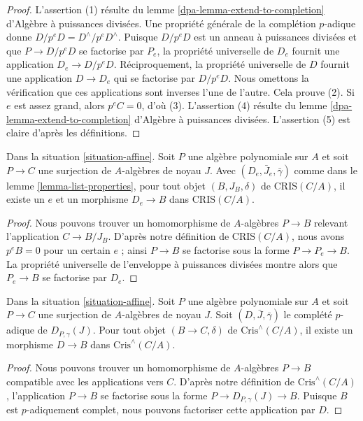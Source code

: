 \begin{proof}
L'assertion (1) résulte du
lemme \ref{dpa-lemma-extend-to-completion} d'Algèbre à puissances divisées.
Une propriété générale de la complétion $p$-adique donne
$D/p^eD = D^\wedge/p^eD^\wedge$. Puisque $D/p^eD$ est un anneau à puissances divisées
et que $P \to D/p^eD$ se factorise par $P_e$, la propriété universelle de
$D_e$ fournit une application $D_e \to D/p^eD$. Réciproquement, la propriété universelle
de $D$ fournit une application $D \to D_e$ qui se factorise par $D/p^eD$. Nous omettons
la vérification que ces applications sont inverses l'une de l'autre. Cela prouve (2).
Si $e$ est assez grand, alors $p^eC = 0$, d'où (3).
L'assertion (4) résulte du
lemme \ref{dpa-lemma-extend-to-completion} d'Algèbre à puissances divisées.
L'assertion (5) est claire d'après les définitions.
\end{proof}

\begin{lemma}
\label{lemma-set-generators}
Dans la situation \ref{situation-affine}.
Soit $P$ une algèbre polynomiale sur $A$ et soit
$P \to C$ une surjection de $A$-algèbres de noyau $J$.
Avec $(D_e, \bar J_e, \bar\gamma)$ comme dans le lemme \ref{lemma-list-properties},
pour tout objet $(B, J_B, \delta)$ de $\text{CRIS}(C/A)$, il
existe un $e$ et un morphisme $D_e \to B$ dans $\text{CRIS}(C/A)$.
\end{lemma}

\begin{proof}
Nous pouvons trouver un homomorphisme de $A$-algèbres $P \to B$
relevant l'application $C \to B/J_B$. D'après notre définition de
$\text{CRIS}(C/A)$, nous avons $p^eB = 0$ pour
un certain $e$ ; ainsi $P \to B$ se factorise sous la forme $P \to P_e \to B$.
La propriété universelle de l'enveloppe à puissances divisées montre alors
que $P_e \to B$ se factorise par $D_e$.
\end{proof}

\begin{lemma}
\label{lemma-generator-completion}
Dans la situation \ref{situation-affine}.
Soit $P$ une algèbre polynomiale sur $A$ et soit
$P \to C$ une surjection de $A$-algèbres de noyau $J$.
Soit $(D, \bar J, \bar\gamma)$ le complété $p$-adique de
$D_{P, \gamma}(J)$. Pour tout objet $(B \to C, \delta)$ de
$\text{Cris}^\wedge(C/A)$, il
existe un morphisme $D \to B$ dans $\text{Cris}^\wedge(C/A)$.
\end{lemma}

\begin{proof}
Nous pouvons trouver un homomorphisme de $A$-algèbres $P \to B$ compatible
avec les applications vers $C$. D'après notre définition de
$\text{Cris}^\wedge(C/A)$, l'application $P \to B$ se factorise sous la forme
$P \to D_{P, \gamma}(J) \to B$. Puisque $B$ est $p$-adiquement complet,
nous pouvons factoriser cette application par $D$.
\end{proof}



